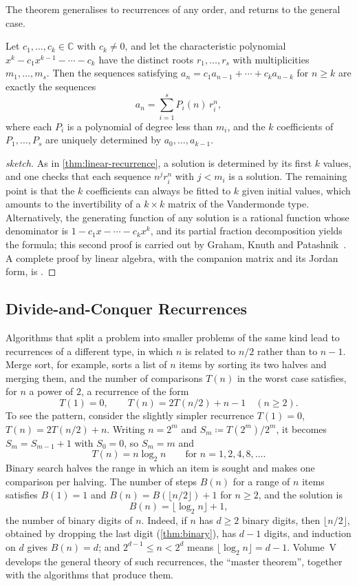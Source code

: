 The theorem generalises to recurrences of any order, and  returns to the general case.

\begin{proposition}
\label{prop:linear-recurrence-k}
Let $c_1,\ldots,c_k\in\mathbb C$ with $c_k\ne0$, and let the characteristic polynomial $x^k-c_1x^{k-1}-\cdots-c_k$ have the distinct roots $r_1,\ldots,r_s$ with multiplicities $m_1,\ldots,m_s$. Then the sequences satisfying $a_n=c_1a_{n-1}+\cdots+c_ka_{n-k}$ for $n\ge k$ are exactly the sequences
\[
a_n=\sum_{i=1}^{s}P_i(n)\,r_i^n,
\]
where each $P_i$ is a polynomial of degree less than $m_i$, and the $k$ coefficients of $P_1,\ldots,P_s$ are uniquely determined by $a_0,\ldots,a_{k-1}$.
\end{proposition}

\begin{proof}[sketch]
As in \cref{thm:linear-recurrence}, a solution is determined by its first $k$ values, and one checks that each sequence $n^jr_i^n$ with $j<m_i$ is a solution. The remaining point is that the $k$ coefficients can always be fitted to $k$ given initial values, which amounts to the invertibility of a $k\times k$ matrix of the Vandermonde type. Alternatively, the generating function of any solution is a rational function whose denominator is $1-c_1x-\cdots-c_kx^k$, and its partial fraction decomposition yields the formula; this second proof is carried out by Graham, Knuth and Patashnik~\cite[Sect.~7.3]{graham1994concrete}. A complete proof by linear algebra, with the companion matrix and its Jordan form, is .
\end{proof}

\subsection{Divide-and-Conquer Recurrences}

Algorithms that split a problem into smaller problems of the same kind lead to recurrences of a different type, in which $n$ is related to $n/2$ rather than to $n-1$. Merge sort, for example, sorts a list of $n$ items by sorting its two halves and merging them, and the number of comparisons $T(n)$ in the worst case satisfies, for $n$ a power of $2$, a recurrence of the form
\[
T(1)=0,\qquad T(n)=2T(n/2)+n-1\quad(n\ge2).
\]
To see the pattern, consider the slightly simpler recurrence $T(1)=0$, $T(n)=2T(n/2)+n$. Writing $n=2^m$ and $S_m\coloneqq T(2^m)/2^m$, it becomes $S_m=S_{m-1}+1$ with $S_0=0$, so $S_m=m$ and
\[
T(n)=n\log_2n\qquad\text{for }n=1,2,4,8,\ldots .
\]
Binary search halves the range in which an item is sought and makes one comparison per halving. The number of steps $B(n)$ for a range of $n$ items satisfies $B(1)=1$ and $B(n)=B(\lfloor n/2\rfloor)+1$ for $n\ge2$, and the solution is
\[
B(n)=\lfloor\log_2n\rfloor+1,
\]
the number of binary digits of $n$. Indeed, if $n$ has $d\ge2$ binary digits, then $\lfloor n/2\rfloor$, obtained by dropping the last digit (\cref{thm:binary}), has $d-1$ digits, and induction on $d$ gives $B(n)=d$; and $2^{d-1}\le n<2^d$ means $\lfloor\log_2n\rfloor=d-1$. Volume~V develops the general theory of such recurrences, the ``master theorem'', together with the algorithms that produce them.

